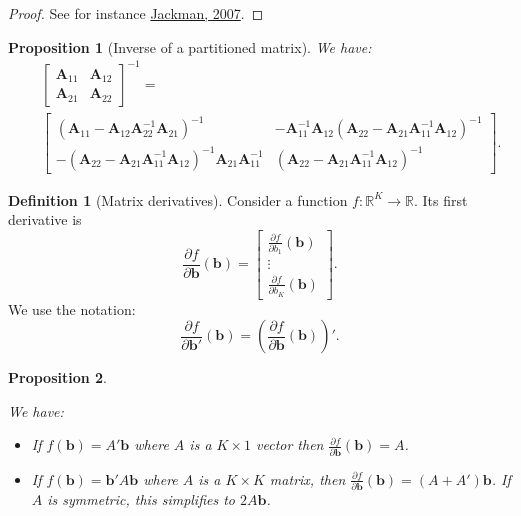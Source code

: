 \documentclass[
  11pt,
]{book}
\providecommand{\tightlist}{%
  \setlength{\itemsep}{0pt}\setlength{\parskip}{0pt}}
\newtheorem{proposition}{Proposition}[chapter]
\theoremstyle{definition}
\newtheorem{definition}{Definition}[chapter]
\theoremstyle{definition}
\theoremstyle{definition}
\theoremstyle{definition}
\theoremstyle{remark}
\begin{document}
\begin{proof}
See for instance \href{http://jackman.stanford.edu/classes/350B/07/ftestforWeb.pdf}{Jackman, 2007}.
\end{proof}

\begin{proposition}[Inverse of a partitioned matrix]
\protect\hypertarget{prp:inversepartitioned}{}\label{prp:inversepartitioned}We have:
\begin{eqnarray*}
&&\left[ \begin{array}{cc} \mathbf{A}_{11} & \mathbf{A}_{12} \\ \mathbf{A}_{21} & \mathbf{A}_{22} \end{array}\right]^{-1} = \\
&&\left[ \begin{array}{cc} (\mathbf{A}_{11} - \mathbf{A}_{12}\mathbf{A}_{22}^{-1}\mathbf{A}_{21})^{-1} & - \mathbf{A}_{11}^{-1}\mathbf{A}_{12}(\mathbf{A}_{22} - \mathbf{A}_{21}\mathbf{A}_{11}^{-1}\mathbf{A}_{12})^{-1} \\
-(\mathbf{A}_{22} - \mathbf{A}_{21}\mathbf{A}_{11}^{-1}\mathbf{A}_{12})^{-1}\mathbf{A}_{21}\mathbf{A}_{11}^{-1} & (\mathbf{A}_{22} - \mathbf{A}_{21}\mathbf{A}_{11}^{-1}\mathbf{A}_{12})^{-1} \end{array} \right].
\end{eqnarray*}
\end{proposition}

\begin{definition}[Matrix derivatives]
\protect\hypertarget{def:FOD}{}\label{def:FOD}Consider a function \(f:\mathbb{R}^K\rightarrow\mathbb{R}\). Its first derivative is
\[
\frac{\partial f}{\partial \mathbf{b}}(\mathbf{b}) =
\left[\begin{array}{c}
\frac{\partial f}{\partial b_1}(\mathbf{b})\\
\vdots\\
\frac{\partial f}{\partial b_K}(\mathbf{b})
\end{array}
\right].
\]
We use the notation:
\[
\frac{\partial f}{\partial \mathbf{b}'}(\mathbf{b}) = \left(\frac{\partial f}{\partial \mathbf{b}}(\mathbf{b})\right)'.
\]
\end{definition}

\begin{proposition}
\protect\hypertarget{prp:partial}{}\label{prp:partial}

We have:

\begin{itemize}
\tightlist
\item
  If \(f(\mathbf{b}) = A' \mathbf{b}\) where \(A\) is a \(K \times 1\) vector then \(\frac{\partial f}{\partial \mathbf{b}}(\mathbf{b}) = A\).
\item
  If \(f(\mathbf{b}) = \mathbf{b}'A\mathbf{b}\) where \(A\) is a \(K \times K\) matrix, then \(\frac{\partial f}{\partial \mathbf{b}}(\mathbf{b}) = (A+A')\mathbf{b}\). If \(A\) is symmetric, this simplifies to \(2A\mathbf{b}\).
\end{itemize}

\end{proposition}
\end{document}

